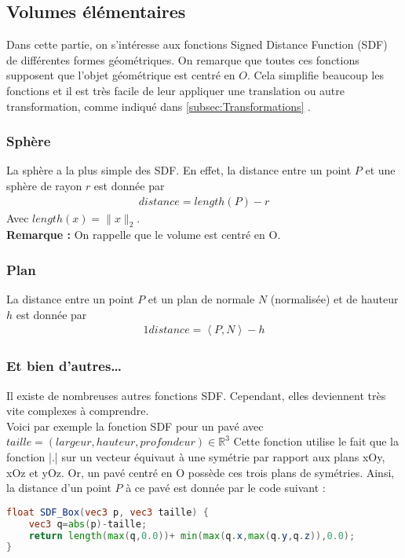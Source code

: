 \subsection{Volumes élémentaires}
Dans cette partie, on s'intéresse aux fonctions Signed Distance Function (SDF) de différentes formes géométriques. On remarque que toutes ces fonctions supposent que l'objet géométrique est centré en $O$. Cela simplifie beaucoup les fonctions et il est très facile de leur appliquer une translation ou autre transformation, comme indiqué dans \ref{subsec:Transformations} .
\subsubsection{Sphère}
La sphère a la plus simple des SDF. En effet, la distance entre un point $P$ et une sphère de rayon $r$ est donnée par 
\begin{align*}
distance=length(P)-r
\end{align*}
Avec $length(x)=\|x\|_2$.
\\\textbf{Remarque :} On rappelle que le volume est centré en O.
\subsubsection{Plan}
La distance entre un point $P$ et un plan de normale $N$ (normalisée) et de hauteur $h$ est donnée par 
\begin{alignat*}{1}
    distance=\left\langle P,N \right\rangle - h
\end{alignat*}
\subsubsection{Et bien d'autres\ldots}
Il existe de nombreuses autres fonctions SDF. Cependant, elles deviennent très vite complexes à comprendre.\\
Voici par exemple la fonction SDF pour un pavé avec $taille=(largeur, hauteur, profondeur) \in \mathbb{R}^3$
Cette fonction utilise le fait que la fonction |.| sur un vecteur équivaut à une symétrie par rapport aux plans xOy, xOz et yOz. Or, un pavé centré en O possède ces trois plans de symétries. Ainsi, la distance d'un point $P$ à ce pavé est donnée par le code suivant :

\begin{lstlisting}[language=GLSL]
float SDF_Box(vec3 p, vec3 taille) {
	vec3 q=abs(p)-taille;
	return length(max(q,0.0))+ min(max(q.x,max(q.y,q.z)),0.0);
}
\end{lstlisting}